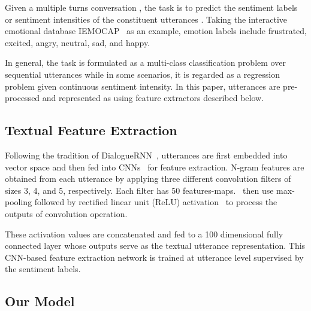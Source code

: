 \documentclass[journal]{IEEEtran}
\begin{document}
Given a multiple turns conversation , the task is to predict the sentiment labels or sentiment intensities of the constituent utterances . Taking the interactive emotional database IEMOCAP~\cite{busso2008iemocap} as an example, emotion labels include frustrated, excited, angry, neutral, sad, and happy.

In general, the task is formulated as a multi-class classification problem over sequential utterances while in some scenarios, it is regarded as a regression problem given continuous sentiment intensity. In this paper, utterances are pre-processed and represented as  using feature extractors described below.

\subsection{Textual Feature Extraction}
\label{sec:feature}
Following the tradition of DialogueRNN~\cite{majumder2019dialoguernn}, utterances are first embedded into vector space and then fed into CNNs~\cite{kim2014convolutional} for feature extraction. N-gram features are obtained from each utterance by applying three different convolution filters of sizes 3, 4, and 5, respectively. Each filter has 50 features-maps.~\cite{majumder2019dialoguernn} then use max-pooling followed by rectified linear unit (ReLU) activation~\cite{nair2010rectified} to process the outputs of convolution operation.

These activation values are concatenated and fed to a 100 dimensional fully connected layer whose outputs serve as the textual utterance representation. This CNN-based feature extraction network is trained at utterance level supervised by the sentiment labels.



\subsection{Our Model}
\end{document}

